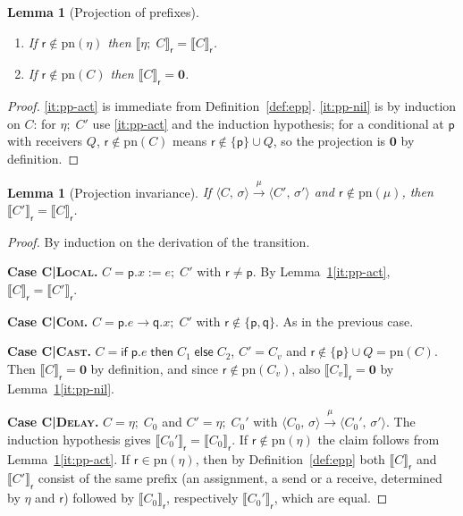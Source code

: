 \documentclass[11pt]{article}
\theoremstyle{plain}
\newtheorem{lemma}[theorem]{Lemma}
\theoremstyle{definition}
\theoremstyle{remark}
\newcommand{\kw}[1]{\mathsf{#1}}
\newcommand{\kif}{\kw{if}\;}
\newcommand{\kthen}{\;\kw{then}\;}
\newcommand{\kelse}{\;\kw{else}\;}
\newcommand{\nil}{\mathbf{0}}
\newcommand{\seq}{;\;}
\newcommand{\pp}{\mathsf{p}}
\newcommand{\qq}{\mathsf{q}}
\newcommand{\rr}{\mathsf{r}}
\newcommand{\pn}{\mathrm{pn}}
\newcommand{\conf}[2]{\langle #1,\, #2\rangle}
\newcommand{\lto}[1]{\xrightarrow{\;#1\;}}
\newcommand{\proj}[2]{\llbracket #1 \rrbracket_{#2}}
\newcommand{\rn}[1]{{\normalfont\scshape #1}}
\newcommand{\ifcond}[3]{\kif #1 \kthen #2 \kelse #3}
\newcommand{\case}[1]{\medskip\noindent\textbf{Case #1.}\;}
\begin{document}
\begin{lemma}[Projection of prefixes]\label{lem:proj-prefix}
  \begin{enumerate}[label=(\roman*),nosep]
  \item\label{it:pp-act} If $\rr\notin\pn(\eta)$ then $\proj{\eta\seq C}{\rr} = \proj{C}{\rr}$.
  \item\label{it:pp-nil} If $\rr\notin\pn(C)$ then $\proj{C}{\rr} = \nil$.
  \end{enumerate}
\end{lemma}
\begin{proof}
  \ref{it:pp-act} is immediate from Definition~\ref{def:epp}.
  \ref{it:pp-nil} is by induction on $C$: for $\eta\seq C'$ use
  \ref{it:pp-act} and the induction hypothesis; for a conditional at $\pp$
  with receivers $Q$, $\rr\notin\pn(C)$ means $\rr\notin\{\pp\}\cup Q$, so the
  projection is $\nil$ by definition.
\end{proof}

\begin{lemma}[Projection invariance]\label{lem:proj-inv}
  If $\conf{C}{\sigma}\lto{\mu}\conf{C'}{\sigma'}$ and $\rr\notin\pn(\mu)$,
  then $\proj{C'}{\rr} = \proj{C}{\rr}$.
\end{lemma}
\begin{proof}
  By induction on the derivation of the transition.

  \case{\rn{C|Local}}
  $C = \pp.x := e\seq C'$ with $\rr\neq\pp$.  By
  Lemma~\ref{lem:proj-prefix}\ref{it:pp-act}, $\proj{C}{\rr} = \proj{C'}{\rr}$.

  \case{\rn{C|Com}}
  $C = \pp.e\to\qq.x\seq C'$ with $\rr\notin\{\pp,\qq\}$.  As in the previous
  case.

  \case{\rn{C|Cast}}
  $C = \ifcond{\pp.e}{C_1}{C_2}$, $C' = C_v$ and
  $\rr\notin\{\pp\}\cup Q = \pn(C)$.  Then $\proj{C}{\rr} = \nil$ by
  definition, and since $\rr\notin\pn(C_v)$, also $\proj{C_v}{\rr} = \nil$ by
  Lemma~\ref{lem:proj-prefix}\ref{it:pp-nil}.

  \case{\rn{C|Delay}}
  $C = \eta\seq C_0$ and $C' = \eta\seq C_0'$ with
  $\conf{C_0}{\sigma}\lto{\mu}\conf{C_0'}{\sigma'}$.  The induction
  hypothesis gives $\proj{C_0'}{\rr} = \proj{C_0}{\rr}$.  If $\rr\notin\pn(\eta)$
  the claim follows from Lemma~\ref{lem:proj-prefix}\ref{it:pp-act}.  If
  $\rr\in\pn(\eta)$, then by Definition~\ref{def:epp} both $\proj{C}{\rr}$ and
  $\proj{C'}{\rr}$ consist of the same prefix (an assignment, a send or a
  receive, determined by $\eta$ and $\rr$) followed by $\proj{C_0}{\rr}$,
  respectively $\proj{C_0'}{\rr}$, which are equal.
\end{proof}
\end{document}
